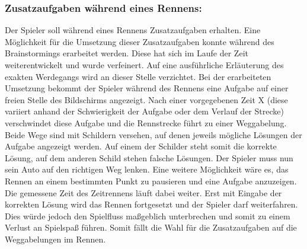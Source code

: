	\subsubsection*{Zusatzaufgaben während eines Rennens:}\label{par:aufgaben}
		Der Spieler soll während eines Rennens Zusatzaufgaben erhalten. Eine Möglichkeit für die Umsetzung dieser Zusatzaufgaben konnte während des Brainstormings erarbeitet werden. Diese hat sich im Laufe der Zeit weiterentwickelt und wurde verfeinert. Auf eine ausführliche Erläuterung des exakten Werdegangs wird an dieser Stelle verzichtet.
		Bei der erarbeiteten Umsetzung bekommt der Spieler während des Rennens eine Aufgabe auf einer freien Stelle des Bildschirms angezeigt. Nach einer vorgegebenen Zeit X (diese variiert anhand der Schwierigkeit der Aufgabe oder dem Verlauf der Strecke) verschwindet diese Aufgabe und die Rennstrecke führt zu einer Weggabelung. Beide Wege sind mit Schildern versehen, auf denen jeweils mögliche Lösungen der Aufgabe angezeigt werden. Auf einem der Schilder steht somit die korrekte Lösung, auf dem anderen Schild stehen falsche Lösungen. Der Spieler muss nun sein Auto auf den richtigen Weg lenken.
		Eine weitere Möglichkeit wäre es, das Rennen an einem bestimmten Punkt zu pausieren und eine Aufgabe anzuzeigen. Die gemessene Zeit des Zeitrennens läuft dabei weiter. Erst mit Eingabe der korrekten Lösung wird das Rennen fortgesetzt und der Spieler darf weiterfahren. Dies würde jedoch den Spielfluss maßgeblich unterbrechen und somit zu einem Verlust an Spielspaß führen. Somit fällt die Wahl für die Zusatzaufgaben auf die Weggabelungen im Rennen.

